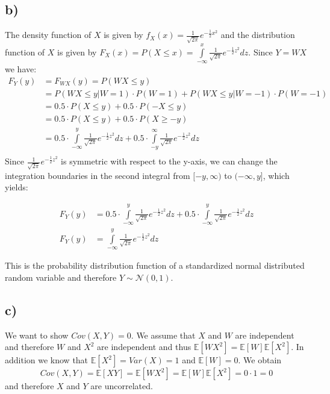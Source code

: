 \documentclass[paper=a4,fontsize=10pt,DIV11,BCOR10mm]{scrartcl}
\begin{document}
\subsection*{b)}
The density function of $X$ is given by $f_X(x)=\frac{1}{\sqrt{2 \pi}} e^{-\frac{1}{2}x^2}$ and the distribution function of $X$ is given by $F_X(x)=P(X\leq x)=\int\limits_{-\infty}^{x} \frac{1}{\sqrt{2 \pi}} e^{-\frac{1}{2}z^2}dz$.
Since $Y=WX$ we have:
\begin{align*}
F_Y(y)&=F_{WX}(y)=P(WX\leq y)\\
&= P(WX\leq y|W=1)\cdot P(W=1)+P(WX\leq y|W=-1)\cdot P(W=-1)\\
&= 0.5 \cdot P(X\leq y)+ 0.5 \cdot P(-X\leq y)\\
&= 0.5 \cdot P(X\leq y)+ 0.5 \cdot P(X \geq -y)\\
&= 0.5 \cdot \int\limits_{-\infty}^{y} \frac{1}{\sqrt{2 \pi}} e^{-\frac{1}{2}z^2}dz+ 0.5 \cdot \int\limits_{-y}^{\infty} \frac{1}{\sqrt{2 \pi}} e^{-\frac{1}{2}z^2}dz\\
\end{align*}
Since $\frac{1}{\sqrt{2 \pi}} e^{-\frac{1}{2}z^2}$ is symmetric with respect to the y-axis, we can change the integration boundaries in the second integral from $[-y,\infty)$ to $(-\infty,y]$, which yields:

\begin{align*}
F_Y(y)&= 0.5 \cdot \int\limits_{-\infty}^{y} \frac{1}{\sqrt{2 \pi}} e^{-\frac{1}{2}z^2}dz+ 0.5 \cdot \int\limits_{-\infty}^{y} \frac{1}{\sqrt{2 \pi}} e^{-\frac{1}{2}z^2}dz\\
F_Y(y)&= \int\limits_{-\infty}^{y} \frac{1}{\sqrt{2 \pi}} e^{-\frac{1}{2}z^2}dz
\end{align*}

This is the probability distribution function of a standardized normal distributed random variable and therefore $Y\sim\mathcal{N}(0,1)$.

\subsection*{c)}
We want to show $Cov(X,Y)=0$. We assume that $X$ and $W$ are independent and therefore $W$ and $X^2$ are independent and thus $\mathbb{E}[WX^2]=\mathbb{E}[W]\mathbb{E}[X^2]$. In addition we know that $\mathbb{E}[X^2]=Var(X)=1$ and $\mathbb{E}[W]=0$. We obtain
\begin{equation*}
Cov(X,Y)=\mathbb{E}[XY]=\mathbb{E}[WX^2]=\mathbb{E}[W]\mathbb{E}[X^2]=0\cdot 1=0
\end{equation*}
and therefore $X$ and $Y$ are uncorrelated.
\end{document}
